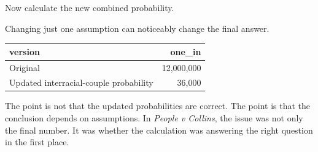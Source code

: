 \documentclass[
  letterpaper,
  DIV=11,
  numbers=noendperiod]{scrreprt}
\newenvironment{Shaded}{\begin{snugshade}}{\end{snugshade}}
\newcommand{\AttributeTok}[1]{\textcolor[rgb]{0.40,0.45,0.13}{#1}}
\newcommand{\DecValTok}[1]{\textcolor[rgb]{0.68,0.00,0.00}{#1}}
\newcommand{\FunctionTok}[1]{\textcolor[rgb]{0.28,0.35,0.67}{#1}}
\newcommand{\NormalTok}[1]{\textcolor[rgb]{0.00,0.23,0.31}{#1}}
\newcommand{\OtherTok}[1]{\textcolor[rgb]{0.00,0.23,0.31}{#1}}
\newcommand{\SpecialCharTok}[1]{\textcolor[rgb]{0.37,0.37,0.37}{#1}}
\newcommand{\StringTok}[1]{\textcolor[rgb]{0.13,0.47,0.30}{#1}}
\begin{document}
Now calculate the new combined probability.

\begin{Shaded}
\end{Shaded}

Changing just one assumption can noticeably change the final answer.

\begin{Shaded}
\end{Shaded}

\begin{table}
\fontsize{12.0pt}{14.0pt}\selectfont
\begin{tabular*}{\linewidth}{@{\extracolsep{\fill}}lr}
\toprule
version & one\_in \\ 
\midrule\addlinespace[2.5pt]
Original & 12,000,000 \\ 
Updated interracial-couple probability & 36,000 \\ 
\bottomrule
\end{tabular*}
\end{table}

The point is not that the updated probabilities are correct. The point
is that the conclusion depends on assumptions. In \emph{People v
Collins}, the issue was not only the final number. It was whether the
calculation was answering the right question in the first place.
\end{document}
